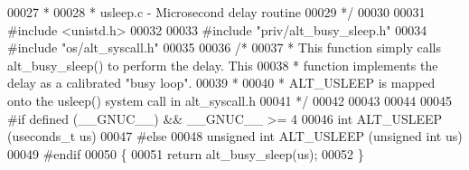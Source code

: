 \begin{DoxyCode}
00027 \textcolor{comment}{ *}
00028 \textcolor{comment}{ * usleep.c - Microsecond delay routine }
00029 \textcolor{comment}{ */}
00030 
00031 \textcolor{preprocessor}{#include <unistd.h>}
00032 
00033 \textcolor{preprocessor}{#include "priv/alt_busy_sleep.h"}
00034 \textcolor{preprocessor}{#include "os/alt_syscall.h"}
00035 
00036 \textcolor{comment}{/*}
00037 \textcolor{comment}{ * This function simply calls alt\_busy\_sleep() to perform the delay. This }
00038 \textcolor{comment}{ * function implements the delay as a calibrated "busy loop".}
00039 \textcolor{comment}{ *}
00040 \textcolor{comment}{ * ALT\_USLEEP is mapped onto the usleep() system call in alt\_syscall.h }
00041 \textcolor{comment}{ */}
00042 
00043 
00044 
00045 \textcolor{preprocessor}{#if defined (\_\_GNUC\_\_) && \_\_GNUC\_\_ >= 4}
00046 \textcolor{keywordtype}{int} ALT_USLEEP (useconds\_t us)
00047 \textcolor{preprocessor}{#else}
00048 \textcolor{keywordtype}{unsigned} \textcolor{keywordtype}{int} ALT_USLEEP (\textcolor{keywordtype}{unsigned} \textcolor{keywordtype}{int} us)
00049 \textcolor{preprocessor}{#endif}
00050 \{
00051   \textcolor{keywordflow}{return} alt_busy_sleep(us);
00052 \}
\end{DoxyCode}
